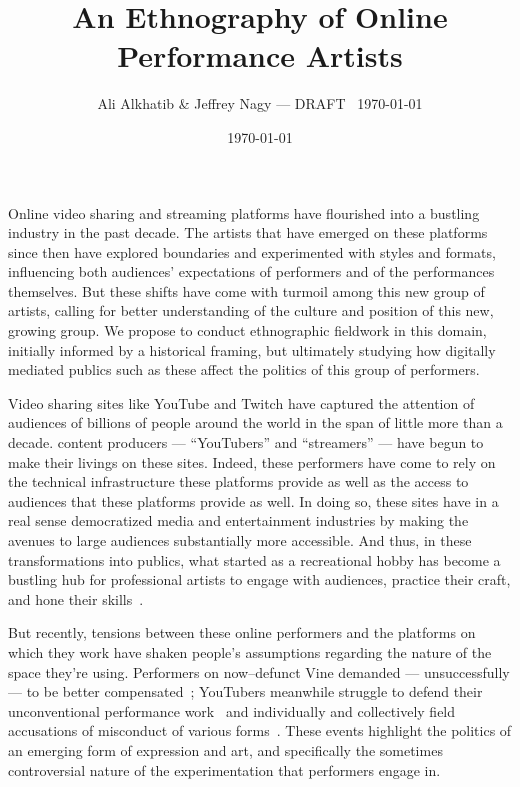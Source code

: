\documentclass[10pt]{article}
\title{An Ethnography of Online Performance Artists}
\author{Ali Alkhatib \& Jeffrey Nagy
--- DRAFT \DTMcurrenttime~\today}
\date{\today}
\makeatletter
\renewcommand{\maketitle}{\bgroup\setlength{\parindent}{0pt}
\begin{flushleft}
  {\scshape \Large \textbf{\@title}}

  \@author
\end{flushleft}\egroup
}
\newcommand{\topic}[1]{{\color{Blue}#1}}
\renewenvironment{abstract}{%
\hfill\begin{minipage}{0.95\textwidth}
\itshape
}
{
\bigskip
\end{minipage}}
\makeatother
\begin{document}
  \maketitle
  \begin{abstract}
  Online video sharing and streaming platforms have flourished into a bustling industry in the past decade.
  The artists that have emerged on these platforms since then have
  explored boundaries and experimented with styles and formats,
  influencing both audiences' expectations of performers and of the performances themselves.
  But these shifts have come with turmoil among this new group of artists,
  calling for better understanding of the culture and position of this new, growing group.
  We propose to conduct ethnographic fieldwork in this domain,
  initially informed by a historical framing, but
  ultimately studying how digitally mediated publics such as these affect
  the politics of this group of performers.
  \end{abstract}



\topic{Video sharing sites like YouTube and Twitch
have captured the attention of audiences of billions of people around the world
in the span of little more than a decade.} %
content producers
--- ``YouTubers'' and ``streamers'' ---
have begun to make their livings on these sites.
Indeed, these performers have come to rely on
the technical infrastructure these platforms provide as well as
the access to audiences that these platforms provide as well.
In doing so, these sites have in a real sense democratized media and entertainment industries by
making the avenues to large audiences substantially more accessible.
And thus, in these transformations into publics, what started as
a recreational hobby
has become a bustling hub for professional artists to
engage with audiences,
practice their craft, and 
hone their skills~\cite{Hamilton:2014:STF:2611105.2557048,Zhang:2015:CIL:2736084.2736091}.

\topic{But recently, tensions between these online performers and the platforms on which they work have shaken people's
assumptions regarding the nature of the space they're using.}
Performers on now--defunct Vine demanded --- unsuccessfully --- to be better compensated~\cite{vineWantsMoney,vineInsiderMeeting};
YouTubers meanwhile struggle to defend their unconventional performance work~\cite{h3h3Lawsuit}
and individually and collectively field accusations of misconduct of various forms~\cite{youtubeDramaResponses}.
These events highlight the politics of an emerging form of expression and art,
and specifically the sometimes controversial nature of the experimentation that performers engage in.
\end{document}
